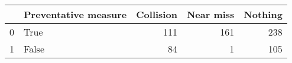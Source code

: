 \begin{tabular}{llrrr}
\toprule
{} &  Preventative measure &  Collision &  Near miss &  Nothing \\
\midrule
0 &                  True &        111 &        161 &      238 \\
1 &                 False &         84 &          1 &      105 \\
\bottomrule
\end{tabular}
